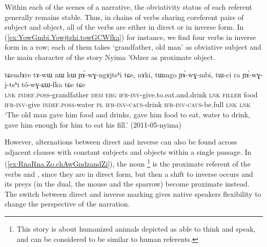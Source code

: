 Within each of the scenes of a narrative, the obviativity status of each referent generally remains stable. Thus, in chains of verbs sharing coreferent pairs of subject and object, all of the verbs are either in direct or in inverse form. In (\ref{ex:YowGmbi.Yowjtshi.towGCWfka}) for instance, we find four verbs in inverse form in a row; each of them takes  `grandfather, old man' as obviative subject and the main character of the story Nyima 'Odzer as proximate object.

\begin{exe}
\ex \label{ex:YowGmbi.Yowjtshi.towGCWfka}
\gll tɕendɤre tɤ-wɯ nɯ kɯ ɲɤ́-wɣ-ngɤjtsʰi tɕe, nɤki, tɯmgo ɲɤ́-wɣ-mbi, tɯ-ci ra ɲɤ́-wɣ-j-tsʰi tó-wɣ-ɕɯ-fka tɕe tɕe \\
\textsc{lnk} \textsc{indef}.\textsc{poss}-grandfather \textsc{dem} \textsc{erg} \textsc{ifr}-\textsc{inv}-give.to.eat.and.drink \textsc{lnk} \textsc{filler} food \textsc{ifr}-\textsc{inv}-give \textsc{indef}.\textsc{poss}-water \textsc{pl} \textsc{ifr}-\textsc{inv}-\textsc{caus}-drink \textsc{ifr}-\textsc{inv}-\textsc{caus}-be.full \textsc{lnk} \textsc{lnk} \\
\glt `The old man gave him food and drinks, gave him food to eat, water to drink, gave him enough for him to eat his fill.' (2011-05-nyima)
\end{exe}


However, alternations between direct and inverse can also be found across adjacent clauses with constant subjects and objects within a single passage. In (\ref{ex:RnaRna.Zo.chAwGndzandZi}), the noun \footnote{This story is about humanized animals depicted as able to think and speak, and can be considered to be similar to human referents. } is the  proximate referent of the verbs  and , since they are in direct form, but then a shift to inverse occurs and its preys (in the dual, the mouse and the sparrow) become proximate instead. The switch between direct and inverse marking gives native speakers flexibility to change the perspective of the narration.


